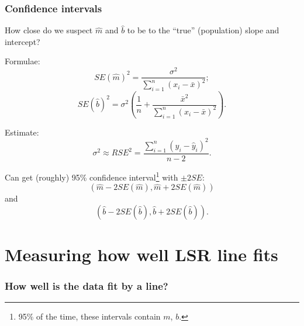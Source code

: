 \documentclass{beamer}
\theoremstyle{example}
\begin{document}
\begin{frame}
    \frametitle{Confidence intervals}
    How close do we suspect $\hat{m}$ and $\hat{b}$ to be to the ``true'' (population) slope and intercept?
    
    Formulae: 
    \[SE(\hat{m})^2 = \frac{\sigma^2}{\sum_{i=1}^n(x_i - \bar{x})^2};\]
    \[SE(\hat{b})^2 = \sigma^2\left(\frac1{n} + \frac{\bar{x}^2}{\sum_{i=1}^n(x_i - \bar{x})^2}\right).\]
    
    Estimate:
        \[\sigma^2 \approx RSE^2 = \frac{\sum_{i=1}^n(y_i - \hat{y}_i)^2}{n-2}.\]
    
        \pause
    Can get (roughly) 95\% confidence interval\footnote{95\% of the time, these intervals contain $m$, $b$.} with $\pm 2SE$: 
        \[(\hat{m} - 2SE(\hat{m}), \hat{m} + 2SE(\hat{m}))\]
    and 
        \[(\hat{b} - 2SE(\hat{b}), \hat{b} + 2SE(\hat{b})).\]
    
\end{frame}

\section{Measuring how well LSR line fits}
\begin{frame}
    \frametitle{How well is the data fit by a line?}
\end{frame}
\end{document}
